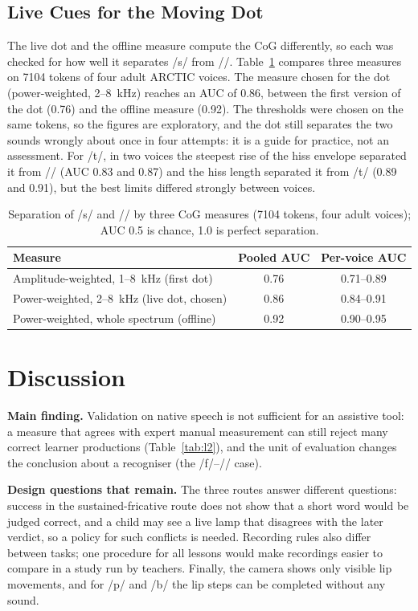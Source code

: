 \documentclass[engproc,article,submit,moreauthors]{Definitions/mdpi}
\newcommand{\ipa}[1]{/#1/}
\begin{document}
\subsection{Live Cues for the Moving Dot}
The live dot and the offline measure compute the CoG differently, so each was checked for how well it separates \ipa{s} from \ipa{\textesh}. Table~\ref{tab:cog} compares three measures on 7104 tokens of four adult ARCTIC voices. The measure chosen for the dot (power-weighted, 2--8~kHz) reaches an AUC of 0.86, between the first version of the dot (0.76) and the offline measure (0.92). The thresholds were chosen on the same tokens, so the figures are exploratory, and the dot still separates the two sounds wrongly about once in four attempts: it is a guide for practice, not an assessment. For \ipa{t\textesh}, in two voices the steepest rise of the hiss envelope separated it from \ipa{\textesh} (AUC 0.83 and 0.87) and the hiss length separated it from \ipa{t} (0.89 and 0.91), but the best limits differed strongly between voices.

\begin{table}[!t]
\caption{Separation of \ipa{s} and \ipa{\textesh} by three CoG measures (7104 tokens, four adult voices); AUC 0.5 is chance, 1.0 is perfect separation.\label{tab:cog}}
\small
\begin{tabularx}{\textwidth}{Xcc}
\toprule
\textbf{Measure} & \textbf{Pooled AUC} & \textbf{Per-voice AUC}\\
\midrule
Amplitude-weighted, 1--8~kHz (first dot) & 0.76 & 0.71--0.89\\
Power-weighted, 2--8~kHz (live dot, chosen) & 0.86 & 0.84--0.91\\
Power-weighted, whole spectrum (offline) & 0.92 & 0.90--0.95\\
\bottomrule
\end{tabularx}
\end{table}

\section{Discussion}\label{sec:disc}
\textbf{Main finding.} Validation on native speech is not sufficient for an assistive tool: a measure that agrees with expert manual measurement can still reject many correct learner productions (Table~\ref{tab:l2}), and the unit of evaluation changes the conclusion about a recogniser (the \ipa{f}--\ipa{\texttheta} case).

\textbf{Design questions that remain.} The three routes answer different questions: success in the sustained-fricative route does not show that a short word would be judged correct, and a child may see a live lamp that disagrees with the later verdict, so a policy for such conflicts is needed. Recording rules also differ between tasks; one procedure for all lessons would make recordings easier to compare in a study run by teachers. Finally, the camera shows only visible lip movements, and for \ipa{p} and \ipa{b} the lip steps can be completed without any sound.
\end{document}
